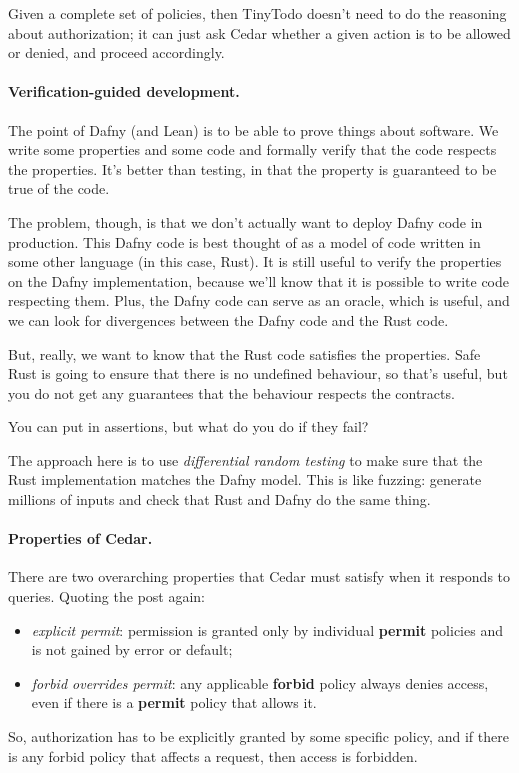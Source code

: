 \documentclass[11pt]{article}
\begin{document}
Given a complete set of policies, then TinyTodo doesn't need to do the reasoning about authorization; it can just
ask Cedar whether a given action is to be allowed or denied, and proceed accordingly.

\paragraph{Verification-guided development.} The point of Dafny (and Lean) is to be able to prove
things about software. We write some properties and some code and
formally verify that the code respects the properties.  It's better
than testing, in that the property is guaranteed to be true of the
code.

The problem, though, is that we don't actually want to deploy Dafny
code in production. This Dafny code is best thought of as a model of
code written in some other language (in this case, Rust). It is still
useful to verify the properties on the Dafny implementation, because
we'll know that it is possible to write code respecting them. Plus,
the Dafny code can serve as an oracle, which is useful, and we can
look for divergences between the Dafny code and the Rust code.

But, really, we want to know that the Rust code satisfies the properties.
Safe Rust is going to ensure that there is no undefined behaviour, so that's
useful, but you do not get any guarantees that the behaviour respects the contracts.

You can put in assertions, but what do you do if they fail?

The approach here is to use \emph{differential random testing} to make sure that the
Rust implementation matches the Dafny model. This is like fuzzing: generate millions of inputs
and check that Rust and Dafny do the same thing.

\paragraph{Properties of Cedar.} There are two overarching properties that Cedar must satisfy
when it responds to queries. Quoting the post again:
\begin{itemize}[noitemsep]
\item \emph{explicit permit}: permission is granted only by individual \textbf{permit} policies and is not gained by error or default;
\item \emph{forbid overrides permit}: any applicable \textbf{forbid} policy always denies access, even if there is a \textbf{permit} policy that allows it.
\end{itemize}
So, authorization has to be explicitly granted by some specific policy, and if there is any forbid policy that affects a request, then access is forbidden.
\end{document}
